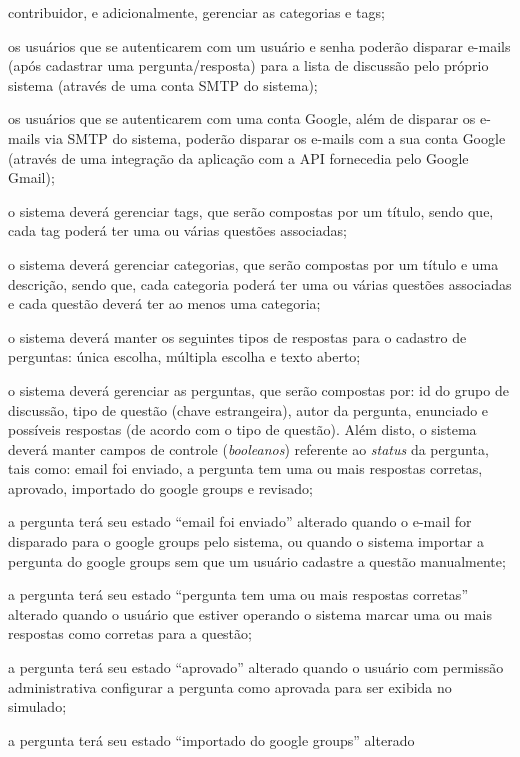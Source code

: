 \begin{alineas}
    contribuidor, e adicionalmente, gerenciar as categorias e tags;
    \item os usuários que se autenticarem com um usuário e senha poderão
    disparar e-mails (após cadastrar uma pergunta/resposta) para a lista de
    discussão pelo próprio sistema (através de uma conta SMTP do sistema);
    \item os usuários que se autenticarem com uma conta Google, além de disparar
    os e-mails via SMTP do sistema, poderão disparar os e-mails com a sua conta
    Google (através de uma integração da aplicação com a API fornecedia pelo
    Google Gmail);
    \item o sistema deverá gerenciar tags, que serão compostas por um título,
    sendo que, cada tag poderá ter uma ou várias questões associadas;
    \item o sistema deverá gerenciar categorias, que serão compostas por um
    título e uma descrição, sendo que, cada categoria poderá ter uma ou várias
    questões associadas e cada questão deverá ter ao menos uma categoria;
    \item o sistema deverá manter os seguintes tipos de respostas para o
    cadastro de perguntas: única escolha, múltipla escolha e texto aberto;
    \item o sistema deverá gerenciar as perguntas, que serão compostas por: id
    do grupo de discussão, tipo de questão (chave estrangeira),  autor da
    pergunta, enunciado e possíveis respostas (de acordo com o tipo de questão).
    Além disto, o sistema deverá manter campos de controle (\textit{booleanos})
    referente ao \textit{status} da pergunta, tais como: email foi enviado, a
    pergunta tem uma ou mais respostas corretas, aprovado, importado do google
    groups e revisado;
    \item a pergunta terá seu estado ``email foi enviado'' alterado quando o
    e-mail for disparado para o google groups pelo sistema, ou quando o sistema
    importar a pergunta do google groups sem que um usuário cadastre a questão
    manualmente;
    \item a pergunta terá seu estado ``pergunta tem uma ou mais respostas
    corretas'' alterado quando o usuário que estiver operando o sistema marcar
    uma ou mais respostas como corretas para a questão;
    \item a pergunta terá seu estado ``aprovado'' alterado quando o usuário com
    permissão administrativa configurar a pergunta como aprovada para ser
    exibida no simulado;
    \item a pergunta terá seu estado ``importado do google groups'' alterado

\end{alineas}
